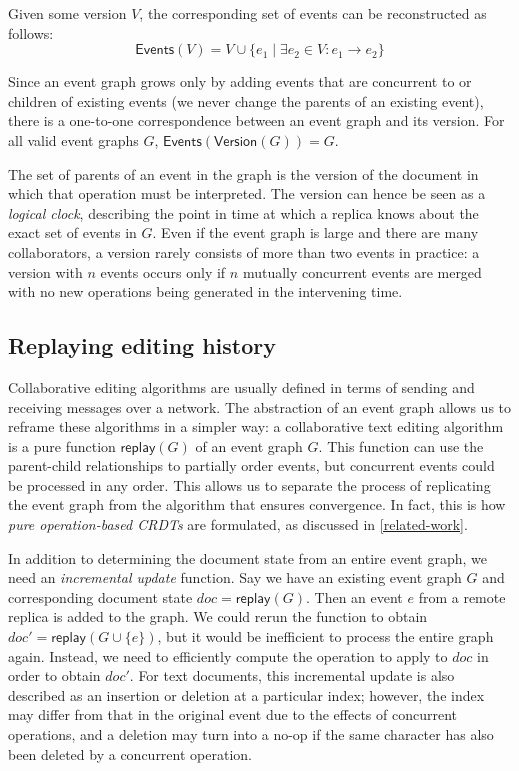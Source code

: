 \documentclass[sigplan,10pt]{acmart}
\begin{document}
Given some version $V$, the corresponding set of events can be reconstructed as follows:
\begin{equation*}
  \mathsf{Events}(V) = V \cup \{e_1 \mid \exists e_2 \in V : e_1 \rightarrow e_2\}
\end{equation*}

Since an event graph grows only by adding events that are concurrent to or children of existing events (we never change the parents of an existing event), there is a one-to-one correspondence between an event graph and its version.
For all valid event graphs $G$, $\mathsf{Events}(\mathsf{Version}(G)) = G$.

The set of parents of an event in the graph is the version of the document in which that operation must be interpreted.
The version can hence be seen as a \emph{logical clock}, describing the point in time at which a replica knows about the exact set of events in $G$.
Even if the event graph is large and there are many collaborators, a version rarely consists of more than two events in practice: a version with $n$ events occurs only if $n$ mutually concurrent events are merged with no new operations being generated in the intervening time.

\subsection{Replaying editing history}\label{replay}

Collaborative editing algorithms are usually defined in terms of sending and receiving messages over a network.
The abstraction of an event graph allows us to reframe these algorithms in a simpler way: a collaborative text editing algorithm is a pure function $\mathsf{replay}(G)$ of an event graph $G$.
This function can use the parent-child relationships to partially order events, but concurrent events could be processed in any order.
This allows us to separate the process of replicating the event graph from the algorithm that ensures convergence.
In fact, this is how \emph{pure operation-based CRDTs} \cite{polog} are formulated, as discussed in \autoref{related-work}.

In addition to determining the document state from an entire event graph, we need an \emph{incremental update} function.
Say we have an existing event graph $G$ and corresponding document state $\mathit{doc} = \mathsf{replay}(G)$. Then an event $e$ from a remote replica is added to the graph.
We could rerun the function to obtain $\mathit{doc}' = \mathsf{replay}(G \cup \{e\})$, but it would be inefficient to process the entire graph again.
Instead, we need to efficiently compute the operation to apply to $\mathit{doc}$ in order to obtain $\mathit{doc}'$.
For text documents, this incremental update is also described as an insertion or deletion at a particular index; however, the index may differ from that in the original event due to the effects of concurrent operations, and a deletion may turn into a no-op if the same character has also been deleted by a concurrent operation.
\end{document}
